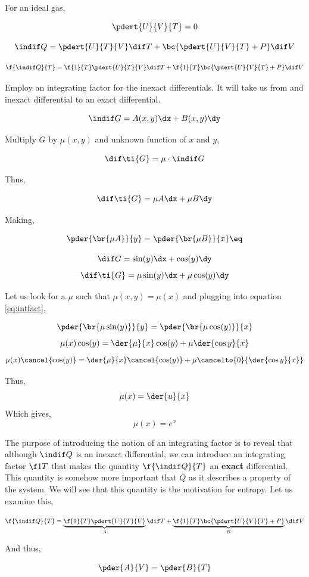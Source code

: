 \documentclass{article}
\begin{document}
For an ideal gas,

\[ \pdert{U}{V}{T} = 0 \]

\[ \indif Q = \pdert{U}{T}{V} \dif T + \bc{\pdert{U}{V}{T} + P}\dif V \]

\[ \f{\indif Q}{T} = \f{1}{T}\pdert{U}{T}{V} \dif T + \f{1}{T}\bc{\pdert{U}{V}{T} + P}\dif V \]

Employ an integrating factor for the inexact differentials. It will take us from and inexact differential to an exact differential.


\[ \indif G = A(x,y)\dx + B(x,y)\dy \]

Multiply $G$ by $\mu(x,y)$ and unknown function of $x$ and $y$,

\[ \dif \ti{G} = \mu \cdot \indif G\]

Thus,

\[ \dif \ti{G} = \mu A \dx + \mu B \dy \]

Making,

\[ \pder{\br{\mu A}}{y} = \pder{\br{\mu B}}{x} \eq \label{eq:intfact} \]


\[ \dif G = \sin(y) \dx + \cos(y) \dy \]
\[ \dif \ti{G} = \mu\sin(y) \dx + \mu\cos(y) \dy \]

Let us look for a $\mu$ such that $\mu(x,y) = \mu(x)$ and plugging into equation \eqref{eq:intfact},

\[ \pder{\br{\mu \sin(y)}}{y} = \pder{\br{\mu \cos(y)}}{x} \]
\[ \mu(x)\cos(y) = \der{\mu}{x}\cos(y) + \mu \der{\cos{y}}{x} \]
\[ \mu(x)\cancel{\cos(y)} = \der{\mu}{x}\cancel{\cos(y)} + \mu \cancelto{0}{\der{\cos{y}}{x}} \]

Thus,
\[ \mu(x) = \der{u}{x} \]
Which gives,
\[ \mu(x) = e^x \]

The purpose of introducing the notion of an integrating factor is to reveal that although $\indif Q$ is an inexact differential, we can introduce an integrating factor $\f1T$ that makes the quantity $\f{\indif Q}{T}$ an \textbf{exact} differential. This quantity is somehow more important that $Q$ as it describes a property of the system. We will see that this quantity is the motivation for entropy. Let us examine this,

\[ \f{\indif Q}{T} = \underbrace{\f{1}{T}\pdert{U}{T}{V}}_{A} \dif T + \underbrace{\f{1}{T}\bc{\pdert{U}{V}{T} + P}}_{B}\dif V \]

And thus,

\[ \pder{A}{V} = \pder{B}{T} \]
\end{document}
